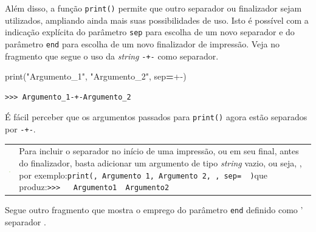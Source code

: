 \documentclass[
]{book}
\newenvironment{Shaded}{\begin{snugshade}}{\end{snugshade}}
\newcommand{\BuiltInTok}[1]{#1}
\newcommand{\NormalTok}[1]{#1}
\newcommand{\OperatorTok}[1]{\textcolor[rgb]{0.81,0.36,0.00}{\textbf{#1}}}
\newcommand{\StringTok}[1]{\textcolor[rgb]{0.31,0.60,0.02}{#1}}
\begin{document}
Além disso, a função \texttt{print()} permite que outro separador ou finalizador sejam utilizados, ampliando ainda mais suas possibilidades de uso. Isto é possível com a indicação explícita do parâmetro \texttt{sep} para escolha de um novo separador e do parâmetro \texttt{end} para escolha de um novo finalizador de impressão. Veja no fragmento que segue o uso da \emph{string} \texttt{-+-} como separador.

\begin{Shaded}
\begin{Highlighting}[]
\BuiltInTok{print}\NormalTok{(}\StringTok{"Argumento\_1"}\NormalTok{, }\StringTok{"Argumento\_2"}\NormalTok{, sep}\OperatorTok{=}\StringTok{\textquotesingle{}{-}+{-}\textquotesingle{}}\NormalTok{)}
\end{Highlighting}
\end{Shaded}

\begin{verbatim}
>>> Argumento_1-+-Argumento_2
\end{verbatim}

É fácil perceber que os argumentos passados para \texttt{print()} agora estão separados por \texttt{-+-}.

\begin{longtable}[]{@{}
  >{\centering\arraybackslash}p{}
  >{\raggedright\arraybackslash}p{}@{}}
\toprule
& \\
\midrule
\endhead
\includegraphics{images/application-green.png} & Para incluir o separador no início de uma impressão, ou em seu final, antes do finalizador, basta adicionar um argumento de tipo \emph{string} vazio, ou seja, \texttt{\textquotesingle{}\textquotesingle{}}, por exemplo:\texttt{print(\textquotesingle{}\textquotesingle{},\ \textquotesingle{}Argumento\ 1\textquotesingle{},\ \textquotesingle{}Argumento\ 2\textquotesingle{},\ \textquotesingle{}\textquotesingle{},\ sep=\textquotesingle{}\ \textbar{}\ \textquotesingle{})}que produz:\texttt{\textgreater{}\textgreater{}\textgreater{}\ \ \textbar{}\ Argumento1\ \textbar{}\ Argumento2\ \textbar{}} \\
\bottomrule
\end{longtable}

Segue outro fragmento que mostra o emprego do parâmetro \texttt{end} definido como ' separador \texttt{\textbar{}\textbar{}}.
\end{document}
